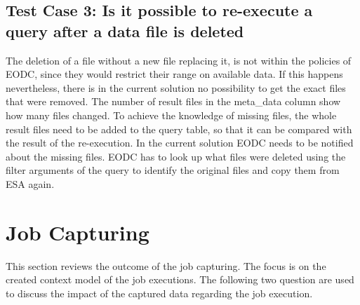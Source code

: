 \documentclass[draft,final]{vutinfth} %
\begin{document}
\subsection*{Test Case 3: Is it possible to re-execute a query after a data file is deleted}
The deletion of a file without a new file replacing it, is not within the policies of EODC, since they would restrict their range on available data. If this happens nevertheless, there is in the current solution no possibility to get the exact files that were removed. The number of result files in the meta\_data column show how many files changed. To achieve the knowledge of missing files, the whole result files need to be added to the query table, so that it can be compared with the result of the re-execution. In the current solution EODC needs to be notified about the missing files. EODC has to look up what files were deleted using the filter arguments of the query to identify the original files and copy them from ESA again. 



\section{Job Capturing}\label{Evaluation:special_jobcap}

This section reviews the outcome of the job capturing. The focus is on the created context model of the job executions. The following two question are used to discuss the impact of the captured data regarding the job execution.  \\
\end{document}
